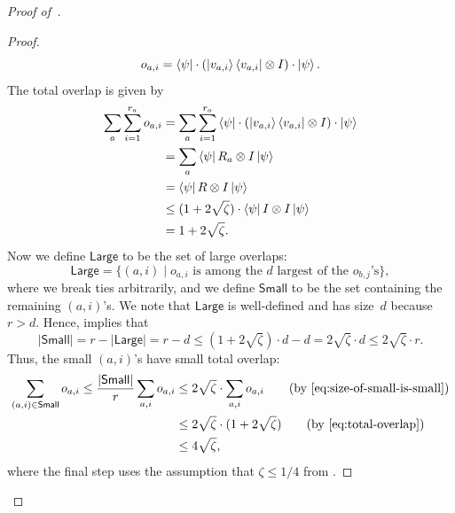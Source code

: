 \begin{proof}[Proof of~]
\begin{proof}
\begin{equation*}
o_{a, i} = \bra{\psi} \cdot (\ket{v_{a,i}}\bra {v_{a,i}} \otimes I) \cdot\ket{\psi}.
\end{equation*}
The total overlap is given by
\begin{align}
\sum_a \sum_{i=1}^{r_a} o_{a, i}
&= \sum_a \sum_{i=1}^{r_a} \bra{\psi} \cdot (\ket{v_{a,i}}\bra {v_{a,i}} \otimes I) \cdot\ket{\psi}\nonumber\\
&= \sum_a \bra{\psi} R_a \otimes I \ket{\psi}\nonumber\\
&= \bra{\psi} R \otimes I \ket{\psi}\nonumber\\
&\leq (1+2\sqrt{\zeta}) \cdot \bra{\psi} I \otimes I \ket{\psi}\nonumber\\
&= 1+2\sqrt{\zeta}.\label{eq:total-overlap}
\end{align}
Now we define $\mathsf{Large}$ to be the set of large overlaps:
\begin{equation*}
\mathsf{Large} = \{(a, i) \mid \text{$o_{a, i}$ is among the~$d$ largest of the $o_{b, j}$'s}\},
\end{equation*}
where we break ties arbitrarily,
and we define $\mathsf{Small}$ to be the set containing the remaining $(a, i)$'s.
We note that $\mathsf{Large}$ is well-defined and has size~$d$ because $r > d$.
Hence,  implies that
\begin{equation}\label{eq:size-of-small-is-small}
|\mathsf{Small}|
= r - |\mathsf{Large}| 
= r - d
\leq (1 + 2\sqrt{\zeta}) \cdot d - d
= 2\sqrt{\zeta} \cdot d
\leq 2\sqrt{\zeta} \cdot r.
\end{equation}
Thus, the small $(a,i)$'s have small total overlap:
\begin{align}
\sum_{(a, i) \in \mathsf{Small}} o_{a, i}
\leq \frac{|\mathsf{Small}|}{r} \sum_{a, i} o_{a,i}
&\leq 2\sqrt{\zeta} \cdot \sum_{a, i} o_{a,i} \tag{by \Cref{eq:size-of-small-is-small}}\\
&\leq 2\sqrt{\zeta} \cdot (1+2\sqrt{\zeta}) \tag{by \Cref{eq:total-overlap}}\\
& \leq 4\sqrt{\zeta}, \label{eq:small-overlaps}
\end{align}
where the final step uses the assumption that $\zeta \leq 1/4$ from .


\end{proof}
\end{proof}
